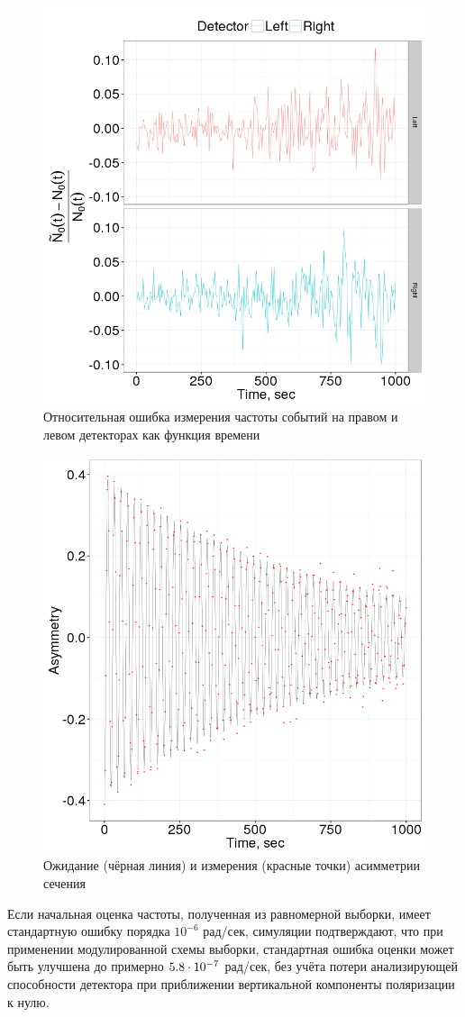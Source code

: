 \begin{figure}[H]
	\centering
	\includegraphics[width=.8\linewidth]{images/App_Stats/LR_detector_relErr}
	\caption{Относительная ошибка измерения частоты событий на правом и левом
		детекторах как функция времени\label{fig:LRDetErr}}
\end{figure}

\begin{figure}[H]
	\centering
	\includegraphics[width=.8\linewidth]{images/App_Stats/Asymmetry}
	\caption{Ожидание (чёрная линия) и измерения (красные точки)
		асимметрии сечения\label{fig:Asym}}
\end{figure}

Если начальная оценка частоты, полученная из равномерной выборки, 
имеет стандартную ошибку порядка $10^{-6}$ рад/сек, симуляции
подтверждают, что при применении модулированной схемы выборки, 
стандартная ошибка оценки может быть улучшена до примерно ${5.8}\cdot 10^{-7}$ рад/сек, 
без учёта потери анализирующей способности детектора
при приближении вертикальной компоненты поляризации к нулю.

